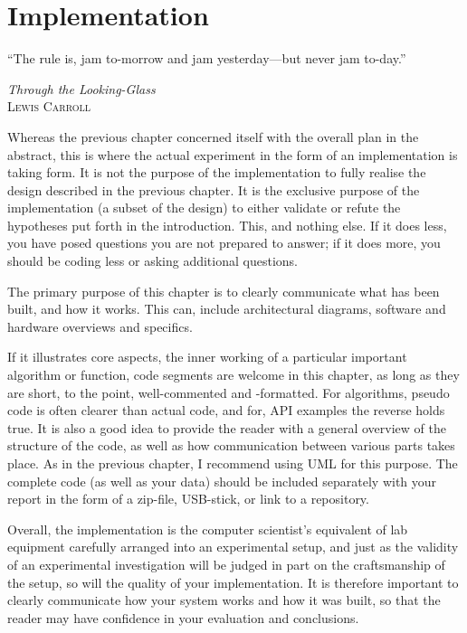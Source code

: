 \chapter{Implementation}
\label{cha:implementation}
\epigraph{``The rule is, jam to-morrow and jam yesterday—but never jam to-day.''}{\textit{Through the Looking-Glass}\\\textsc{Lewis Carroll}}



Whereas the previous chapter concerned itself with the overall plan in the
abstract, this is where the actual experiment in the form of an
implementation is taking form.  It is not the purpose of the implementation
to fully realise the design described in the previous chapter. It is the
exclusive purpose of the implementation (a subset of the design) to either
validate or refute the hypotheses put forth in the introduction. This, and
nothing else. If it does less, you have posed questions you are not prepared
to answer; if it does more, you should be coding less or asking additional
questions.

The primary purpose of this chapter is to clearly communicate what has been
built, and how it works. This can, \eg include architectural diagrams,
software and hardware overviews and specifics.

If it illustrates core aspects, \eg the inner working of a particular
important algorithm or function, code segments are welcome in this chapter,
as long as they are short, to the point, well-commented and -formatted.  For
algorithms, pseudo code is often clearer than actual code, and for, \eg
\acs{API} examples the reverse holds true.  It is also a good idea to
provide the reader with a general overview of the structure of the code, as
well as how communication between various parts takes place.  As in the
previous chapter, I recommend using \ac{UML} for this purpose.  The complete
code (as well as your data) should be included separately with your report
in the form of a zip-file, USB-stick, or link to a repository.

Overall, the implementation is the computer scientist's equivalent of lab
equipment carefully arranged into an experimental setup, and just as the
validity of an experimental investigation will be judged in part on the
craftsmanship of the setup, so will the quality of your implementation. It
is therefore important to clearly communicate how your system works and how
it was built, so that the reader may have confidence in your evaluation and
conclusions.

